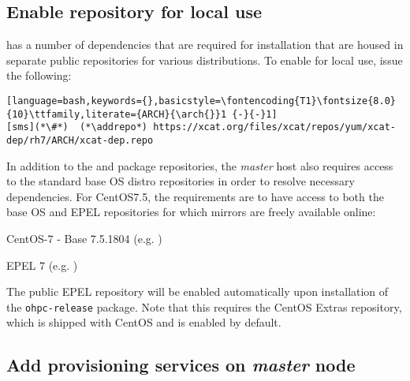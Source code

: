 \documentclass[letterpaper]{article}
\newcommand{\baseOS}{CentOS7.5}
\newcommand{\arch}{x86\_64}
\newcommand{\addrepo}{wget -P /etc/yum.repos.d}
\begin{document}
\subsection{Enable \xCAT{} repository for local use} \label{sec:enable_xcat}


\noindent \xCAT{} has a number of dependencies that are required for
installation that are housed in separate public repositories for various
distributions. To enable for local use, issue the following:

\begin{lstlisting}[language=bash,keywords={},basicstyle=\fontencoding{T1}\fontsize{8.0}{10}\ttfamily,literate={ARCH}{\arch{}}1 {-}{-}1]
[sms](*\#*)  (*\addrepo*) https://xcat.org/files/xcat/repos/yum/xcat-dep/rh7/ARCH/xcat-dep.repo
\end{lstlisting}

In addition to the \OHPC{} and \xCAT{} package repositories, the {\em master} host also
requires access to the standard base OS distro repositories in order to resolve
necessary dependencies. For \baseOS{}, the requirements are to have access to
both the base OS and EPEL repositories for which mirrors are freely available online:

\begin{itemize*}
\item CentOS-7 - Base 7.5.1804
  (e.g. \href{http://mirror.centos.org/centos-7/7/os/x86\_64}
             {\color{blue}{http://mirror.centos.org/centos-7/7/os/x86\_64}} )
\item EPEL 7 (e.g. \href{http://download.fedoraproject.org/pub/epel/7/x86\_64}
                        {\color{blue}{http://download.fedoraproject.org/pub/epel/7/x86\_64}} )
\end{itemize*}

\noindent The public EPEL repository will be enabled automatically upon installation of the 
\texttt{ohpc-release} package. Note that this requires the CentOS Extras
repository, which is shipped with CentOS and is enabled by default.




\subsection{Add provisioning services on {\em master} node} \label{sec:add_provisioning}



\end{document}
